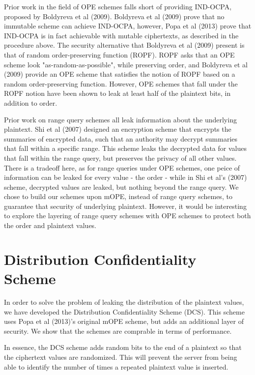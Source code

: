 \documentclass[12pt]{article}
\begin{document}
Prior work in the field of OPE schemes falls short of providing IND-OCPA, proposed by Boldyreva et al (2009). Boldyreva et al (2009) prove that no immutable scheme can achieve IND-OCPA, however, Popa et al (2013) prove that IND-OCPA is in fact achievable with mutable ciphertexts, as described in the procedure above. The security alternative that Boldyreva et al (2009) present is that of random order-preserving function (ROPF). ROPF asks that an OPE scheme look "as-random-as-possible", while preserving order, and Boldyreva et al (2009) provide an OPE scheme that satisfies the notion of ROPF based on a random order-preserving function. However, OPE schemes that fall under the ROPF notion have been shown to leak at least half of the plaintext bits, in addition to order.

Prior work on range query schemes all leak information about the underlying plaintext. Shi et al (2007) designed an encryption scheme that encrypts the summaries of encrypted data, such that an authority may decrypt summaries that fall within a specific range. This scheme leaks the decrypted data for values that fall within the range query, but preserves the privacy of all other values. There is a tradeoff here, as for range queries under OPE schemes, one peice of information can be leaked for every value - the order - while in Shi et al's (2007) scheme, decrypted values are leaked, but nothing beyond the range query. We chose to build our schemes upon mOPE, instead of range query schemes, to guarantee that security of underlying plaintext. However, it would be interesting to explore the layering of range query schemes with OPE schemes to protect both the order and plaintext values.

\section{Distribution Confidentiality Scheme}

In order to solve the problem of leaking the distribution of the plaintext values, we have developed the Distribution Confidentiality Scheme (DCS). This scheme uses Popa et al (2013)'s original mOPE scheme, but adds an additional layer of security. We show that the schemes are comprable in terms of performance.

In essence, the DCS scheme adds random bits to the end of a plaintext so that the ciphertext values are randomized. This will prevent the server from being able to identify the number of times a repeated plaintext value is inserted.
\end{document}
